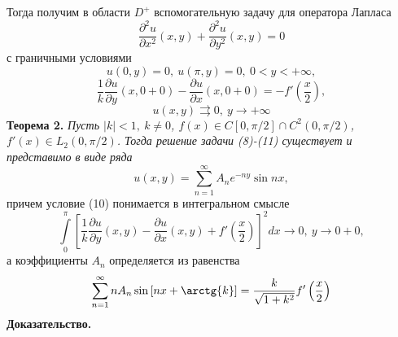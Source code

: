 \documentclass[9pt]{article}
\begin{document}
	Тогда получим в области $D^{+}$ вспомогательную задачу для оператора Лапласа 
	\begin{equation}
		\dfrac{\partial^2 u}{\partial x^2}(x,y) + \dfrac{\partial^2 u}{\partial y^2}(x,y) = 0
	\end{equation}
	с граничными условиями 
	\begin{equation}
		u(0,y) = 0, \ u(\pi, y) = 0, \ 0 < y < +\infty, 
	\end{equation}
	\begin{equation}
		\dfrac{1}{k} \dfrac{\partial u}{\partial y}(x,0+0) - \dfrac{\partial u}{\partial x}(x,0+0) = -f'\left(\dfrac{x}{2}\right),
	\end{equation}
	\begin{equation}
		u(x,y) \rightrightarrows 0, \ y \to +\infty 
	\end{equation}
	\textbf{Теорема 2.} \textit{Пусть $|k| < 1, \ k \neq 0$, $f(x) \in C[0, \pi/2] \cap C^2(0, \pi/2)$, $f'(x) \in L_2(0, \pi/2)$. Тогда решение задачи (8)-(11) существует и представимо в виде ряда
	\begin{equation*}
		u(x,y) = \sum\limits_{n=1}^{\infty} A_n e^{-ny} \sin{nx},
		\end{equation*}}
	причем условие (10) понимается в интегральном смысле
	\begin{equation*}
		\int\limits_0^\pi \left[	\dfrac{1}{k} \dfrac{\partial u}{\partial y}(x,y) - \dfrac{\partial u}{\partial x}(x,y) + f'\left(\dfrac{x}{2}\right)\right]^2 dx \to 0, \ y \to 0 + 0,
	\end{equation*}
	а коэффициенты $A_n$ определяется из равенства
	\begin{equation}
		\sum\limits_{n=1}^{\infty} n A_n \sin{\left[nx + \arctg{k}\right]} = \dfrac{k}{\sqrt{1 + k^2}} f'\left(\dfrac{x}{2}\right) 
	\end{equation}
	\textbf{Доказательство.} 
	
\end{document}

